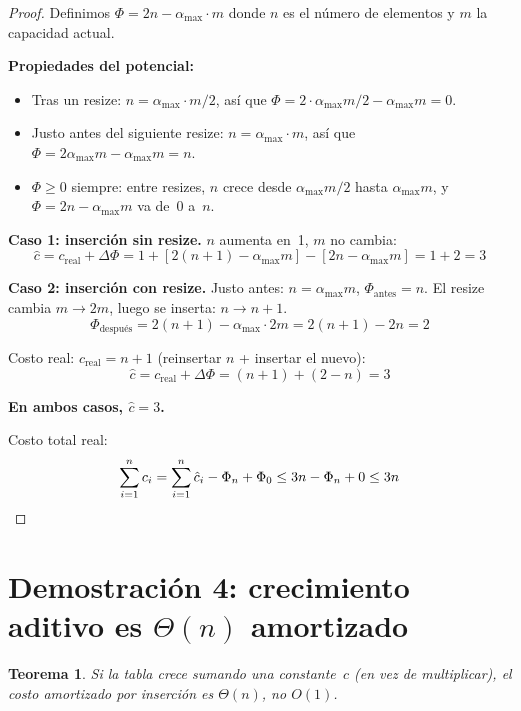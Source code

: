 \documentclass[11pt, letterpaper]{article}
\theoremstyle{definition}
\theoremstyle{plain}
\newtheorem{theorem}{Teorema}[section]
\theoremstyle{remark}
\begin{document}
\begin{proof}
Definimos $\Phi = 2n - \alpha_{\max} \cdot m$ donde $n$ es el número
de elementos y $m$ la capacidad actual.

\textbf{Propiedades del potencial:}
\begin{itemize}
  \item Tras un resize: $n = \alpha_{\max} \cdot m/2$, así que
    $\Phi = 2 \cdot \alpha_{\max} m/2 - \alpha_{\max} m = 0$.
  \item Justo antes del siguiente resize: $n = \alpha_{\max} \cdot m$,
    así que $\Phi = 2\alpha_{\max} m - \alpha_{\max} m = n$.
  \item $\Phi \geq 0$ siempre: entre resizes, $n$ crece desde
    $\alpha_{\max} m/2$ hasta $\alpha_{\max} m$, y
    $\Phi = 2n - \alpha_{\max} m$ va de~0 a~$n$.
\end{itemize}

\textbf{Caso 1: inserción sin resize.} $n$ aumenta en~1, $m$ no
cambia:
\[
  \hat{c} = c_{\text{real}} + \Delta\Phi
  = 1 + [2(n{+}1) - \alpha_{\max} m] - [2n - \alpha_{\max} m]
  = 1 + 2 = 3
\]

\textbf{Caso 2: inserción con resize.} Justo antes:
$n = \alpha_{\max} m$, $\Phi_{\text{antes}} = n$. El resize cambia
$m \to 2m$, luego se inserta: $n \to n + 1$.
\[
  \Phi_{\text{después}}
  = 2(n{+}1) - \alpha_{\max} \cdot 2m
  = 2(n{+}1) - 2n = 2
\]

Costo real: $c_{\text{real}} = n + 1$ (reinsertar $n$ + insertar el
nuevo):
\[
  \hat{c} = c_{\text{real}} + \Delta\Phi
  = (n + 1) + (2 - n) = 3
\]

\textbf{En ambos casos, $\hat{c} = 3$.}

Costo total real:
\[
  \sum_{i=1}^{n} c_i
  = \sum_{i=1}^{n} \hat{c}_i - \Phi_n + \Phi_0
  \leq 3n - \Phi_n + 0 \leq 3n \qedhere
\]
\end{proof}

\section{Demostración 4: crecimiento aditivo es
  \texorpdfstring{$\Theta(n)$}{Theta(n)} amortizado}

\begin{theorem}\label{thm:additive}
Si la tabla crece sumando una constante~$c$ (en vez de multiplicar),
el costo amortizado por inserción es $\Theta(n)$, no $O(1)$.
\end{theorem}
\end{document}
